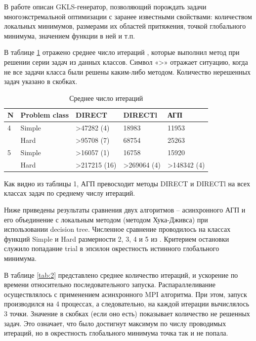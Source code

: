 \documentclass{svproc}
\begin{document}
В работе \cite{fio_bib13, fio_bib17} описан GKLS-генератор, позволяющий порождать задачи многоэкстремальной оптимизации с заранее известными свойствами: количеством локальных минимумов, размерами их областей притяжения, точкой глобального минимума, значением функции в ней и т.п.

В таблице \ref{tab:1} отражено среднее число итераций , которые выполнил метод при решении серии задач из данных классов. Символ «>» отражает ситуацию, когда не все задачи класса были решены каким-либо методом. Количество нерешенных задач указано в скобках.


\begin{table}[!ht]
    \caption{Среднее число итераций}
    \label{tab:1}
    \centering
    \begin{tabular}{|l|l|l|l|l|}
    \hline
        N & Problem class & DIRECT & DIRECTl & АГП  \\ \hline
        4 & Simple & >47282 (4) & 18983 & 11953  \\ \hline
        ~ & Hard & >95708 (7) & 68754 & 25263  \\ \hline
        5 & Simple & >16057 (1) & 16758 & 15920  \\ \hline
        ~ & Hard & >217215 (16) & >269064 (4) & >148342 (4)  \\ \hline
    \end{tabular}
\end{table}

Как видно из таблицы 1, АГП превосходит методы DIRECT и DIRECTl на всех классах задач по среднему числу итераций. 


Ниже приведены результаты сравнения двух алгоритмов – асинхронного АГП и его объединение с локальным методом (методом Хука-Дживса) при использовании decision tree. Численное сравнение проводилось на классах функций Simple и Hard размерности 2, 3, 4 и 5 из \cite{fio_bib19}. Критерием остановки служило попадание trial в эпсилон окрестность истинного глобального минимума. 

В таблице \ref{tab:2} представлено среднее количество итераций, и ускорение по времени относительно последовательного запуска. Распараллеливание  осуществлялось с применением асинхронного MPI алгоритма. При этом, запуск производился на 4 процессах, а следовательно, на каждой итерации вычислялось 3 точки. Значение в скобках (если оно есть) показывает количество не решенных задач. Это означает, что было достигнут максимум по числу проводимых итераций, но в окрестность глобального минимума точка так и не попала.
\end{document}
